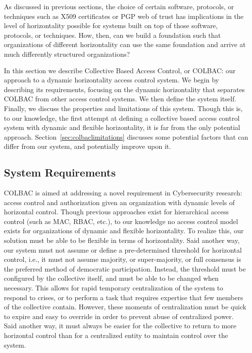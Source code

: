 As discussed in previous sections, the choice of certain software, protocols, or
techniques such as X509 certificates or PGP web of trust has implications in the
level of horizontality possible for systems built on top of those software,
protocols, or techniques. How, then, can we build a foundation such that
organizations of different horizontality can use the same foundation and arrive
at much differently structured organizations?

In this section we describe Collective Based Access Control, or COLBAC: our
approach to a dynamic horizontality access control system. We begin by
describing its requirements, focusing on the dynamic horizontality that
separates COLBAC from other access control systems. We then define the system
itself. Finally, we discuss the properties and limitations of this system.
Though this is, to our knowledge, the first attempt at defining a collective
based access control system with dynamic and flexible horizontality, it is far
from the only potential approach. Section~\ref{sec:colbaclimitations} discusses
some potential factors that can differ from our system, and potentially improve
upon it.

\subsection{System Requirements}
\label{sec:colbacrequirements}
COLBAC is aimed at addressing a novel requirement in Cybersecurity research:
access control and authorization given an organization with dynamic levels of
horizontal control. Though previous approaches exist for hierarchical access
control (such as MAC, RBAC, etc.), to our knowledge no access control model
exists for organizations of dynamic and flexible horizontality. To realize
this, our solution must be able to be flexible in terms of horizontality. Said
another way, our system must not assume or define a pre-determined threshold for
horizontal control, i.e., it must not assume majority, or super-majority, or
full consensus is the preferred method of democratic participation. Instead,
the threshold must be configured by the collective itself, and must be able to
be changed when necessary. This allows for rapid temporary centralization of the
system to respond to crises, or to perform a task that requires expertise that
few members of the collective contain. However, these moments of centralization
must be quick to expire and easy to override in order to prevent abuse of
centralized power. Said another way, it must always be easier for the collective
to return to more horizontal control than for a centralized entity to maintain
control over the system.

